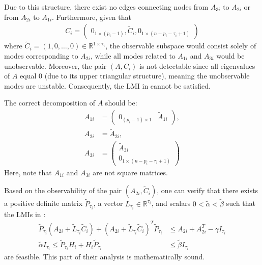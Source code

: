 \documentclass[journal]{IEEEtran}
\begin{document}
Due to this structure, there exist no edges connecting nodes from $A_{3i}$ to $A_{2i}$ or from $A_{2i}$ to $A_{1i}$. Furthermore, given that 
\begin{align}
C_i = \begin{pmatrix} 0_{1\times(p_i-1)}, \tilde{C}_i, 0_{1\times(n-p_i-\tau_i+1)} \end{pmatrix}
\end{align}
where $\tilde{C}_i = (1,0,\dots,0)\in\mathbb{R}^{1\times \tau_i}$, the observable subspace would consist solely of modes corresponding to $A_{2i}$, while all modes related to $A_{1i}$ and $A_{3i}$ would be unobservable. Moreover, the pair $(A,C_i)$ is not detectable since all eigenvalues of $A$ equal 0 (due to its upper triangular structure), meaning the unobservable modes are unstable. Consequently, the LMI in \cite[Lemma 5]{Chang2021} cannot be satisfied.

The correct decomposition of $A$ should be:
\begin{align*}
    A_{1i} &= \begin{pmatrix}
        0_{(p_i-1)\times 1} & \tilde{A}_{1i}
    \end{pmatrix}, \\
    A_{2i} &= \tilde{A}_{2i}, \\
    A_{3i} &= \begin{pmatrix}
        \tilde{A}_{3i} \\ 0_{1\times (n-p_i-\tau_i+1)}
    \end{pmatrix}
\end{align*}
Here, note that $A_{1i}$ and $A_{3i}$ are not square matrices.

Based on the observability of the pair $(A_{2i},\tilde{C}_i)$, one can verify that there exists a positive definite matrix $\tilde{P}_{\tau_i}$, a vector $L_{\tau_i}\in\mathbb{R}^{\tau_i}$, and scalars $0<\tilde{\alpha} < \tilde{\beta}$ such that the LMIs in \cite[Appendix C]{Chang2021}:
\begin{align*}
    \tilde{P}_{\tau_i}(A_{2i} + \tilde{L}_{\tau_i}\tilde{C}_i) + (A_{2i} + \tilde{L}_{\tau_i}\tilde{C}_i)^T \tilde{P}_{\tau_i} &\leq A_{2i} + A_{2i}^T - \gamma I_{\tau_i}  \\
    \tilde{\alpha} I_{\tau_i} \leq \tilde{P}_{\tau_i} H_i + H_i \tilde{P}_{\tau_i} &\leq \tilde{\beta} I_{\tau_i}
\end{align*}
are feasible. This part of their analysis is mathematically sound.
\end{document}
